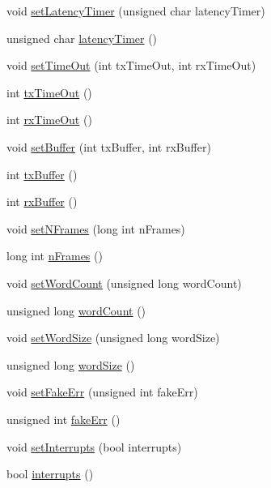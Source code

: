 \begin{DoxyCompactItemize}
void \hyperlink{classUsbFTInterface_abe0147f74ac414d0bd2cb4a7a81024b9}{setLatencyTimer} (unsigned char latencyTimer)
\item 
unsigned char \hyperlink{classUsbFTInterface_a4fa70ce4a4cd4f8f01cdeb4835f11276}{latencyTimer} ()
\item 
void \hyperlink{classUsbFTInterface_a62d90f80a81d1decd66f9b9f10cb8dc6}{setTimeOut} (int txTimeOut, int rxTimeOut)
\item 
int \hyperlink{classUsbFTInterface_acab2397cb42003a1ed8f69a0c6cae195}{txTimeOut} ()
\item 
int \hyperlink{classUsbFTInterface_ad95ffb87539ca86882e26fa24b00de97}{rxTimeOut} ()
\item 
void \hyperlink{classUsbFTInterface_aaa09fdc28deb45d0a65f5d42c06dd659}{setBuffer} (int txBuffer, int rxBuffer)
\item 
int \hyperlink{classUsbFTInterface_acac73d3fc1587437656bb7fe24e10906}{txBuffer} ()
\item 
int \hyperlink{classUsbFTInterface_a836d1a8d181fd49e11235bb677e3fa7e}{rxBuffer} ()
\item 
void \hyperlink{classUsbFTInterface_a247a19741032fa0f330cc3f6c17ed08b}{setNFrames} (long int nFrames)
\item 
long int \hyperlink{classUsbFTInterface_a694f5cb1d38d4369a597ad6761762c0e}{nFrames} ()
\item 
void \hyperlink{classUsbFTInterface_a8251b4faa76c380ea41d795482532e30}{setWordCount} (unsigned long wordCount)
\item 
unsigned long \hyperlink{classUsbFTInterface_a2acaf55e8c253f20e1f25a023c9238f4}{wordCount} ()
\item 
void \hyperlink{classUsbFTInterface_a1666f09d2b8994f8d13d6bc66f43b530}{setWordSize} (unsigned long wordSize)
\item 
unsigned long \hyperlink{classUsbFTInterface_add098ede127a2089e3ac8ea615ed6d46}{wordSize} ()
\item 
void \hyperlink{classUsbFTInterface_aec057577db0b913beedf1e9896498e10}{setFakeErr} (unsigned int fakeErr)
\item 
unsigned int \hyperlink{classUsbFTInterface_abb29c7f73506259ef57d1e25204f8f7c}{fakeErr} ()
\item 
void \hyperlink{classUsbFTInterface_a6fb31500f8a6adbd3d6f84f7932844da}{setInterrupts} (bool interrupts)
\item 
bool \hyperlink{classUsbFTInterface_a1831ba02d9707ded902af4cb1df8863f}{interrupts} ()
\item 

\end{DoxyCompactItemize}
